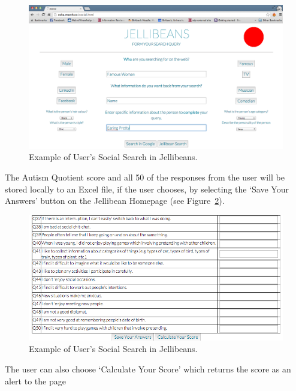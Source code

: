\documentclass[a4paper, 11pt]{article}
\begin{document}
\begin{figure}[H]
\begin{center}
\includegraphics[scale=0.3]{SocialCompleted}
\caption{Example of User's Social Search in Jellibeans.}
\label{socialCompleted}
\end{center}
\end{figure}


\vspace{5mm} %

The Autism Quotient score and all 50 of the responses from the user will be stored locally to an Excel file, if the user chooses, by selecting the `Save Your Answers' button on the Jellibean Homepage (see Figure~\ref{saveScores}).

\begin{figure}[H]
\begin{center}
\includegraphics[scale=0.3]{saveScores}
\caption{Example of User's Social Search in Jellibeans.}
\label{saveScores}
\end{center}
\end{figure}

The user can also choose `Calculate Your Score' which returns the score as an alert to the page
\end{document}
